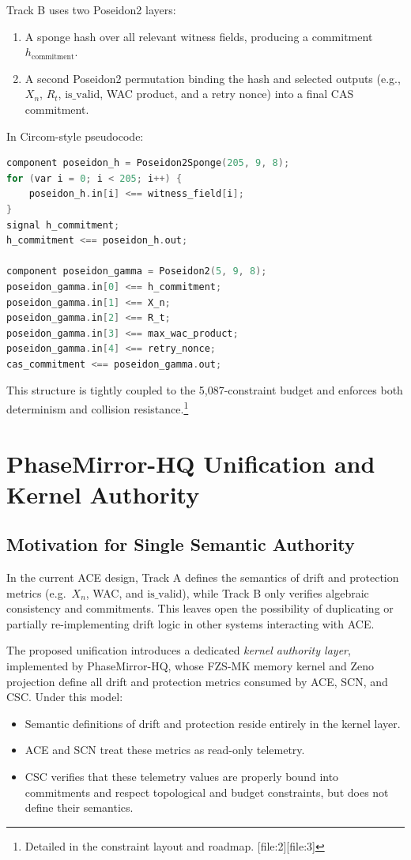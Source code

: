 \documentclass[11pt]{article}
\begin{document}
Track B uses two Poseidon2 layers:
\begin{enumerate}[leftmargin=*]
  \item A sponge hash over all relevant witness fields, producing a commitment \(h_{\mathrm{commitment}}\).
  \item A second Poseidon2 permutation binding the hash and selected outputs (e.g., \(X_n\), \(R_t\), \(\mathrm{is\_valid}\), WAC product, and a retry nonce) into a final CAS commitment.
\end{enumerate}
In Circom-style pseudocode:
\begin{lstlisting}[style=code,language=C]
component poseidon_h = Poseidon2Sponge(205, 9, 8);
for (var i = 0; i < 205; i++) {
    poseidon_h.in[i] <== witness_field[i];
}
signal h_commitment;
h_commitment <== poseidon_h.out;

component poseidon_gamma = Poseidon2(5, 9, 8);
poseidon_gamma.in[0] <== h_commitment;
poseidon_gamma.in[1] <== X_n;
poseidon_gamma.in[2] <== R_t;
poseidon_gamma.in[3] <== max_wac_product;
poseidon_gamma.in[4] <== retry_nonce;
cas_commitment <== poseidon_gamma.out;
\end{lstlisting}
This structure is tightly coupled to the 5{,}087-constraint budget and enforces both determinism and collision resistance.\footnote{Detailed in the constraint layout and roadmap. [file:2][file:3]}

\section{PhaseMirror-HQ Unification and Kernel Authority}

\subsection{Motivation for Single Semantic Authority}

In the current ACE design, Track A defines the semantics of drift and protection metrics (e.g.\ \(X_n\), WAC, and \(\mathrm{is\_valid}\)), while Track B only verifies algebraic consistency and commitments. This leaves open the possibility of duplicating or partially re-implementing drift logic in other systems interacting with ACE.

The proposed unification introduces a dedicated \emph{kernel authority layer}, implemented by PhaseMirror-HQ, whose FZS-MK memory kernel and Zeno projection define all drift and protection metrics consumed by ACE, SCN, and CSC. Under this model:
\begin{itemize}[leftmargin=*]
  \item Semantic definitions of drift and protection reside entirely in the kernel layer.
  \item ACE and SCN treat these metrics as read-only telemetry.
  \item CSC verifies that these telemetry values are properly bound into commitments and respect topological and budget constraints, but does not define their semantics.
\end{itemize}
\end{document}
